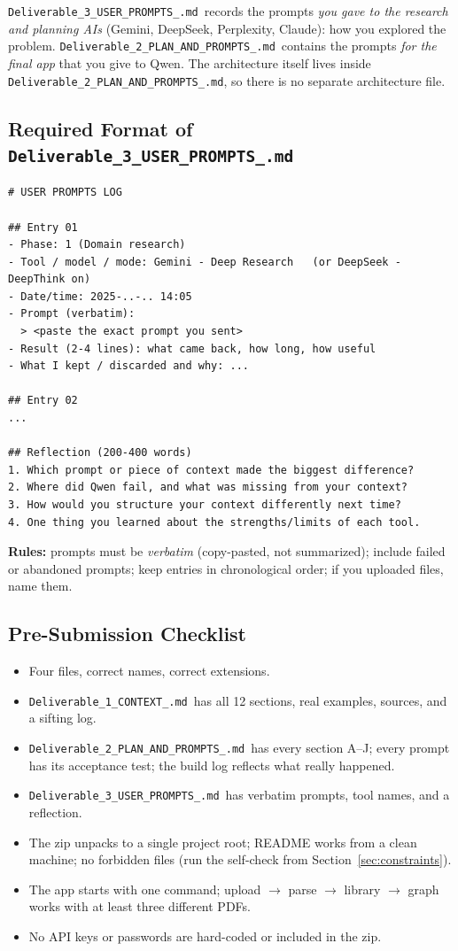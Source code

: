 \documentclass[11pt,a4paper]{article}
\newcommand{\uid}{[HeUserID]}
\newcommand{\dA}{\texttt{Deliverable\_1\_\allowbreak CONTEXT\_\allowbreak\uid.md}}
\newcommand{\dB}{\texttt{Deliverable\_2\_\allowbreak PLAN\_AND\_PROMPTS\_\allowbreak\uid.md}}
\newcommand{\dC}{\texttt{Deliverable\_3\_\allowbreak USER\_PROMPTS\_\allowbreak\uid.md}}
\begin{document}
\begin{notebox}
\dC\ records the prompts \emph{you gave to the research and planning AIs} (Gemini, DeepSeek, Perplexity, Claude): how you explored the problem. \dB\ contains the prompts \emph{for the final app} that you give to Qwen. The architecture itself lives inside \dB, so there is no separate architecture file.
\end{notebox}

\subsection{Required Format of \dC}
\begin{lstlisting}
# USER PROMPTS LOG

## Entry 01
- Phase: 1 (Domain research)
- Tool / model / mode: Gemini - Deep Research   (or DeepSeek - DeepThink on)
- Date/time: 2025-..-.. 14:05
- Prompt (verbatim):
  > <paste the exact prompt you sent>
- Result (2-4 lines): what came back, how long, how useful
- What I kept / discarded and why: ...

## Entry 02
...

## Reflection (200-400 words)
1. Which prompt or piece of context made the biggest difference?
2. Where did Qwen fail, and what was missing from your context?
3. How would you structure your context differently next time?
4. One thing you learned about the strengths/limits of each tool.
\end{lstlisting}

\textbf{Rules:} prompts must be \emph{verbatim} (copy-pasted, not summarized); include failed or abandoned prompts; keep entries in chronological order; if you uploaded files, name them.

\subsection{Pre-Submission Checklist}
\begin{itemize}[label=$\square$]
\item Four files, correct names, correct extensions.
\item \dA\ has all 12 sections, real examples, sources, and a sifting log.
\item \dB\ has every section A--J; every prompt has its acceptance test; the build log reflects what really happened.
\item \dC\ has verbatim prompts, tool names, and a reflection.
\item The zip unpacks to a single project root; README works from a clean machine; no forbidden files (run the self-check from Section~\ref{sec:constraints}).
\item The app starts with one command; upload $\rightarrow$ parse $\rightarrow$ library $\rightarrow$ graph works with at least three different PDFs.
\item No API keys or passwords are hard-coded or included in the zip.
\end{itemize}
\end{document}
